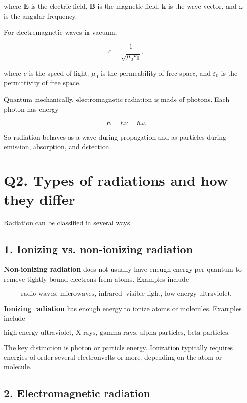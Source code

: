 \documentclass[12pt]{article}
\begin{document}
where $\mathbf{E}$ is the electric field, $\mathbf{B}$ is the magnetic field, $\mathbf{k}$ is the wave vector, and $\omega$ is the angular frequency.

For electromagnetic waves in vacuum,

\begin{equation}
c=\frac{1}{\sqrt{\mu_0\varepsilon_0}},
\end{equation}

where $c$ is the speed of light, $\mu_0$ is the permeability of free space, and $\varepsilon_0$ is the permittivity of free space.

Quantum mechanically, electromagnetic radiation is made of photons. Each photon has energy

\begin{equation}
E=h\nu=\hbar\omega.
\end{equation}

So radiation behaves as a wave during propagation and as particles during emission, absorption, and detection.

\section*{Q2. Types of radiations and how they differ}

Radiation can be classified in several ways.

\subsection*{1. Ionizing vs. non-ionizing radiation}

\textbf{Non-ionizing radiation} does not usually have enough energy per quantum to remove tightly bound electrons from atoms. Examples include

\[
\text{radio waves, microwaves, infrared, visible light, low-energy ultraviolet.}
\]

\textbf{Ionizing radiation} has enough energy to ionize atoms or molecules. Examples include

\[
\text{high-energy ultraviolet, X-rays, gamma rays, alpha particles, beta particles, neutrons.}
\]

The key distinction is photon or particle energy. Ionization typically requires energies of order several electronvolts or more, depending on the atom or molecule.

\subsection*{2. Electromagnetic radiation}
\end{document}
